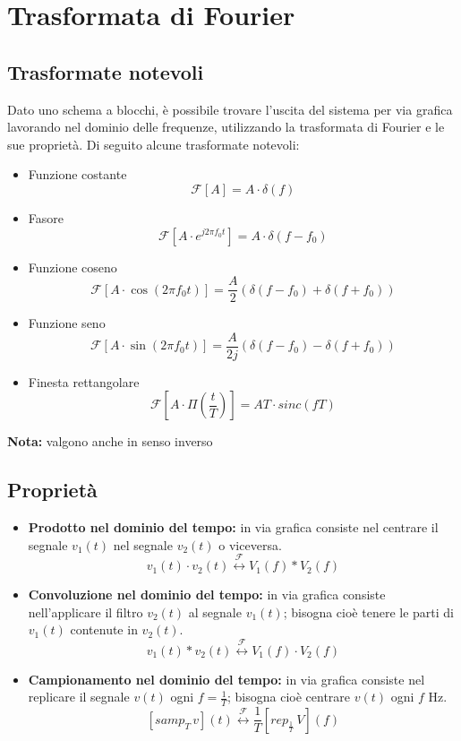 \documentclass[a4paper,oneside,titlepage]{book}
\newcommand{\xlongleftrightarrow}[1]{\overset{#1}{\longleftrightarrow}}
\begin{document}
\chapter{Trasformata di Fourier}

\section{Trasformate notevoli}
Dato uno schema a blocchi, è possibile trovare l’uscita del sistema per via grafica lavorando nel dominio delle frequenze, utilizzando la trasformata di Fourier e le sue proprietà. Di seguito alcune trasformate notevoli:
\begin{itemize}
\item Funzione costante
\[ \mathcal{F} \left[ A \right] = A \cdot \delta(f) \]

\item Fasore
\[ \mathcal{F} \left[ A \cdot e^{j 2\pi f_0 t} \right] = A \cdot \delta(f-f_0) \]

\item Funzione coseno
\[ \mathcal{F} \left[ A \cdot \cos(2\pi f_0 t) \right] = \frac{A}{2} \left( \delta(f-f_0) + \delta(f+f_0) \right) \]

\item Funzione seno
\[ \mathcal{F} \left[ A \cdot \sin(2\pi f_0 t) \right] = \frac{A}{2j} \left( \delta(f-f_0) - \delta(f+f_0) \right) \]

\item Finesta rettangolare
\[ \mathcal{F} \left[ A \cdot \Pi \left( \frac{t}{T} \right) \right] = AT \cdot sinc(fT) \]
\end{itemize}

\textbf{Nota:} valgono anche in senso inverso

\section{Proprietà}
\begin{itemize}
\item \textbf{Prodotto nel dominio del tempo:} in via grafica consiste nel centrare il segnale $v_1(t)$ nel segnale $v_2(t)$ o viceversa.
\[ v_1(t) \cdot v_2(t) \xlongleftrightarrow{\mathcal{F}} V_1(f) * V_2(f) \]

\item \textbf{Convoluzione nel dominio del tempo:} in via grafica consiste nell'applicare il filtro $v_2(t)$ al segnale $v_1(t)$; bisogna cioè tenere le parti di $v_1(t)$ contenute in $v_2(t)$.
\[ v_1(t) * v_2(t) \xlongleftrightarrow{\mathcal{F}} V_1(f) \cdot V_2(f) \]

\item \textbf{Campionamento nel dominio del tempo:} in via grafica consiste nel replicare il segnale $v(t)$ ogni $f = \frac{1}{T}$; bisogna cioè centrare $v(t)$ ogni $f$ Hz.
\[ [samp_T \, v](t) \xlongleftrightarrow{\mathcal{F}} \frac{1}{T} [rep_{\frac{1}{T}} \, V](f) \]
\end{itemize}
\end{document}
